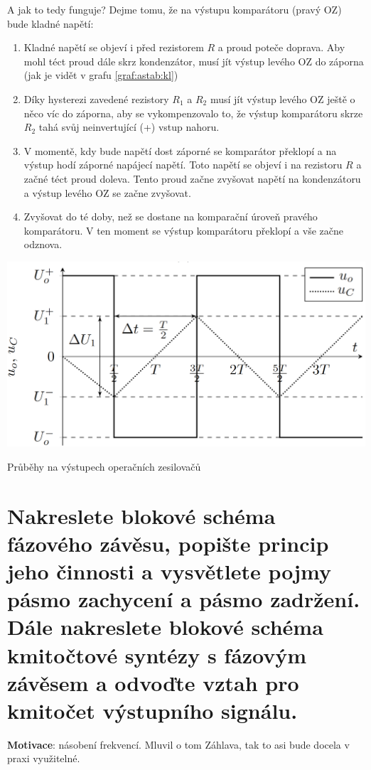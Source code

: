 \documentclass[a4paper,12pt]{article}   %
\begin{document}
A jak to tedy funguje? Dejme tomu, že na výstupu komparátoru (pravý OZ) bude kladné napětí:
\begin{enumerate}
    \item Kladné napětí se objeví i před rezistorem $R$ a proud poteče doprava. Aby mohl téct proud dále skrz kondenzátor, musí jít výstup levého OZ do záporna (jak je vidět v grafu \ref{graf:astab:kl})
    \item Díky hysterezi zavedené rezistory $R_1$ a $R_2$ musí jít výstup levého OZ ještě o něco víc do záporna, aby se vykompenzovalo to, že výstup komparátoru skrze $R_2$ tahá svůj neinvertující (+) vstup nahoru.
    \item V momentě, kdy bude napětí dost záporné se komparátor překlopí a na výstup hodí záporné napájecí napětí. Toto napětí se objeví i na rezistoru $R$ a začné téct proud doleva. Tento proud začne zvyšovat napětí na kondenzátoru a výstup levého OZ se začne zvyšovat.
    \item Zvyšovat do té doby, než se dostane na komparační úroveň pravého komparátoru. V ten moment se výstup komparátoru překlopí a vše začne odznova.
\end{enumerate}

\begin{graf}[h!]
    \centering
    \includegraphics[width = .75\textwidth]{gen_funct-graf.PNG}
    \caption{Průběhy na výstupech operačních zesilovačů}
    \label{graf:gen:fci}
\end{graf}









\section{Nakreslete blokové schéma fázového závěsu, popište princip jeho činnosti a vysvětlete pojmy pásmo zachycení a pásmo zadržení. Dále nakreslete blokové schéma kmitočtové syntézy s fázovým závěsem a odvoďte vztah pro kmitočet výstupního signálu.}
\textbf{Motivace}: násobení frekvencí. Mluvil o tom Záhlava, tak to asi bude docela v praxi využitelné.
\end{document}
